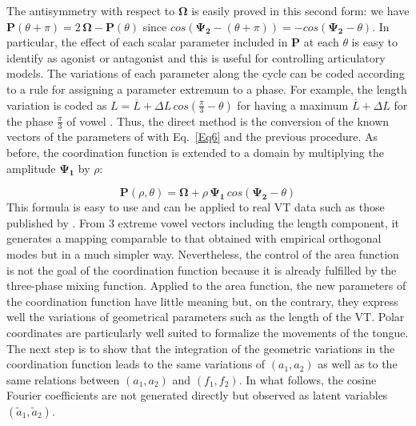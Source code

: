 \documentclass[10pt,twocolumn]{article}
\newcommand{\linenomath}{}                 %
\let\cite\citep                             %
\begin{document}
The antisymmetry with respect to $\bm{\Omega}$ is easily proved in this second form: we have $\bm{P}(\theta+\pi) = 2\,\bm{\Omega} - \bm{P}(\theta)$ since $cos(\bm{\Psi_2} - (\theta+\pi))=-cos(\bm{\Psi_2} -\theta)$. In particular, the effect of each scalar parameter included in $\bm{P}$ at each $\theta$ is easy to identify as agonist or antagonist and this is useful for controlling articulatory models. The variations of each parameter along the cycle can be coded according to a rule for assigning a parameter extremum to a phase. For example, the length variation is coded as $L=\overline{L}+\Delta L\,cos(\tfrac{\pi}{3}-\theta)$ for having a maximum $\overline{L}+\Delta L$ for the phase $\tfrac{\pi}{3}$ of vowel \textipa{[u]}. Thus, the direct method is the conversion of the known vectors of the parameters of \textipa{[u,a,i]} with Eq.~\ref{Eq6} and the previous procedure. As before, the coordination function is extended to a domain by multiplying the amplitude $\bm{\Psi_1}$ by $\rho$:
\linenomath
\begin{equation}
\bm{P}(\rho,\theta) = \bm{\Omega} + \rho\,\bm{\Psi_1}\, cos(\bm{\Psi_2} - \theta) \label{Eq7}
\end{equation}
This formula is easy to use and can be applied to real VT data such as those published by \cite{Story2005}. From 3 extreme vowel vectors including the length component, it generates a mapping comparable to that obtained with empirical orthogonal modes but in a much simpler way. Nevertheless, the control of the area function is not the goal of the coordination function because it is already fulfilled by the three-phase mixing function. Applied to the area function, the new parameters of the coordination function have little meaning but, on the contrary, they express well the variations of geometrical parameters such as the length of the VT. Polar coordinates are particularly well suited to formalize the movements of the tongue. The next step is to show that the integration of the geometric variations in the coordination function leads to the same variations of $(a_1,a_2)$ as well as to the same relations between $(a_1,a_2)$ and $(f_1,f_2)$. In what follows, the cosine Fourier coefficients are not generated directly but observed as latent variables $(\tilde{a}_1, \tilde{a}_2)$.
\end{document}
